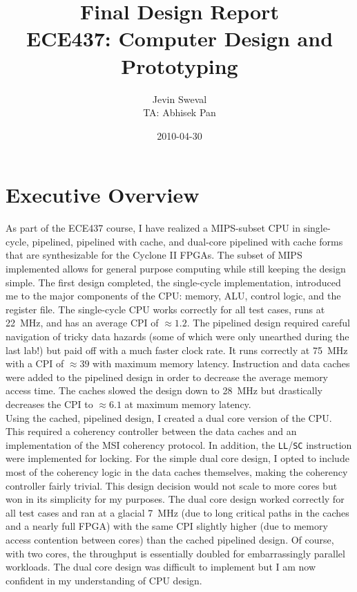 \documentclass[12pt]{article}
\title{Final Design Report \\
ECE437: Computer Design and Prototyping}
\author{Jevin Sweval \\
        TA: Abhisek Pan}
\date{2010-04-30}
\begin{document}
  \maketitle
  \newpage

\section{Executive Overview}
As part of the ECE437 course, I have realized a MIPS-subset CPU in single-cycle, pipelined, pipelined with cache, and dual-core pipelined with cache forms that are synthesizable for the Cyclone II FPGAs. The subset of MIPS implemented allows for general purpose computing while still keeping the design simple. The first design completed, the single-cycle implementation, introduced me to the major components of the CPU: memory, ALU, control logic, and the register file. The single-cycle CPU works correctly for all test cases, runs at 22~MHz, and has an average CPI of $\approx 1.2$. The pipelined design required careful navigation of tricky data hazards (some of which were only unearthed during the last lab!) but paid off with a much faster clock rate. It runs correctly at 75~MHz with a CPI of $\approx 39$ with maximum memory latency. Instruction and data caches were added to the pipelined design in order to decrease the average memory access time. The caches slowed the design down to 28~MHz but drastically decreases the CPI to $\approx 6.1$ at maximum memory latency.\\

Using the cached, pipelined design, I created a dual core version of the CPU. This required a coherency controller between the data caches and an implementation of the MSI coherency protocol. In addition, the \texttt{LL}/\texttt{SC} instruction were implemented for locking. For the simple dual core design, I opted to include most of the coherency logic in the data caches themselves, making the coherency controller fairly trivial. This design decision would not scale to more cores but won in its simplicity for my purposes. The dual core design worked correctly for all test cases and ran at a glacial 7~MHz (due to long critical paths in the caches and a nearly full FPGA) with the same CPI slightly higher (due to memory access contention between cores) than the cached pipelined design. Of course, with two cores, the throughput is essentially doubled for embarrassingly parallel workloads. The dual core design was difficult to implement but I am now confident in my understanding of CPU design.\\
\end{document}
